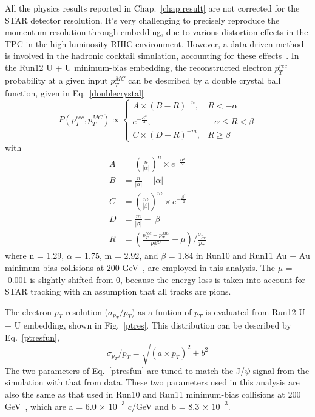 All the physics results reported in Chap.~\ref{chap:result} are not corrected for the STAR detector resolution. It's very challenging to precisely reproduce the momentum resolution through embedding, due to various distortion effects in the TPC in the high luminosity RHIC environment. However, a data-driven method is involved in the hadronic cocktail simulation, accounting for these effects~\cite{STAR:dielectron1}. In the Run12 U + U minimum-bias embedding, the reconstructed electron $p_{T}^{rec}$ probability at a given input $p_{T}^{MC}$ can be described by a double crystal ball function, given in Eq.~\ref{doublecrystal}
\begin{equation} \label{doublecrystal}
P(p_{T}^{rec}, p_{T}^{MC}) \propto 
\begin{cases}
 A \times (B - R)^{-n}, &  R < -\alpha \\
 e^{-\frac{R^{2}}{2}}, & -\alpha \leq R < \beta \\
 C \times (D + R)^{-m}, & R \geq \beta
\end{cases}
\end{equation}
with
\begin{equation} \label{define}
\begin{split}
 A &= \left(\frac{n}{|\alpha|}\right)^{n}\times e^{-\frac{\alpha^{2}}{2}} \\ 
 B &= \frac{n}{|\alpha|} - |\alpha| \\
 C &= \left(\frac{m}{|\beta|}\right)^{m}\times e^{-\frac{\beta^{2}}{2}} \\
 D &= \frac{m}{|\beta|} - |\beta| \\
 R &= \left(\frac{p_{T}^{rec} - p_{T}^{MC}}{p_{T}^{MC}} - \mu\right)/\frac{\sigma_{p_{T}}}{p_{T}}
 \end{split}
 \end{equation}
where n = 1.29, $\alpha$ = 1.75, m = $2.92$, and $\beta$ = 1.84 in Run10 and Run11 Au + Au minimum-bias collisions at 200 GeV~\cite{STAR:dielectron1}, are employed in this analysis. The $\mu$ = -0.001 is slightly shifted from 0, because the energy loss is taken into account for STAR tracking with an assumption that all tracks are pions. 

The electron $p_{T}$ resolution ($\sigma_{p_{T}}/p_{T}$) as a funtion of  $p_{T}$ is evaluated from Run12 U + U embedding, shown in Fig.~\ref{ptres}. This distribution can be described by Eq.~\ref{ptresfun},
 \begin{equation} \label{ptresfun}
 \sigma_{p_{T}}/p_{T} = \sqrt{(a \times p_{T})^{2} + b^{2}}
 \end{equation}
The two parameters of Eq.~\ref{ptresfun} are tuned to match the J/$\psi$ signal from the simulation with that from data. These two parameters used in this analysis are also the same as that used in Run10 and Run11 minimum-bias collisions at 200 GeV~\cite{STAR:dielectron1}, which are a = 6.0 $\times$ $10^{-3}$ $c$/GeV and b = 8.3 $\times$ $10^{-3}$.

